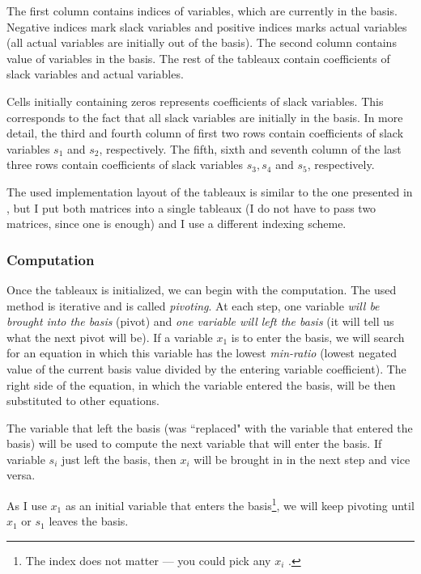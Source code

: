 \documentclass[a4paper,10pt]{article}
\begin{document}
The first column contains indices of variables, which are currently in the
basis. Negative indices mark slack variables and positive indices marks actual
variables (all actual variables are initially out of the basis). The second
column contains value of variables in the basis. The rest of the tableaux
contain coefficients of slack variables and actual variables.

Cells initially containing zeros represents coefficients of slack variables.
This corresponds to the fact that all slack variables are initially in the
basis. In more detail, the third and fourth column of first two rows contain
coefficients of slack variables $s_{1}$ and $s_{2}$, respectively. The fifth,
sixth and seventh column of the last three rows contain coefficients of slack
variables $s_{3}, s_{4}$ and $s_{5}$, respectively.

The used implementation layout of the tableaux is similar to the one presented
in \cite{Codenotti08}, but I put both matrices into a single tableaux (I do not
have to pass two matrices, since one is enough) and I use a different
indexing scheme.

\subsubsection{Computation}

Once the tableaux is initialized, we can begin with the computation. The used
method is iterative and is called \emph{pivoting}. At each step, one variable
\emph{will be brought into the basis} (pivot) and \emph{one variable will left
the basis} (it will tell us what the next pivot will be). If a variable $x_{1}$
is to enter the basis, we will search for an equation in which this variable
has the lowest \emph{min-ratio} (lowest negated value of the current basis
value divided by the entering variable coefficient). The right side of the
equation, in which the variable entered the basis, will be then substituted to
other equations.

The variable that left the basis (was ``replaced" with the variable that
entered the basis) will be used to compute the next variable that will enter
the basis. If variable $s_{i}$ just left the basis, then $x_{i}$ will be
brought in in the next step and vice versa.

As I use $x_{1}$ as an initial variable that enters the basis\footnote{The
index does not matter --- you could pick any $x_{i}$ \cite{Pritchard08}.}, we
will keep pivoting until $x_{1}$ or $s_{1}$ leaves the basis.
\end{document}
